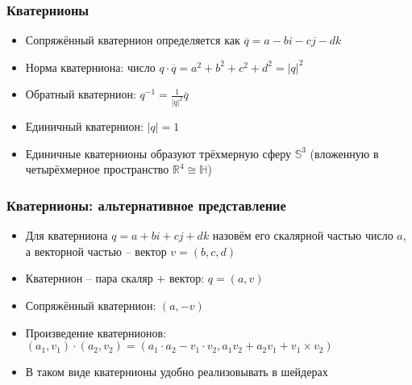 \documentclass[10pt]{beamer}
\begin{document}
\begin{frame}[fragile]
\frametitle{Кватернионы}
\begin{itemize}
\item Сопряжённый кватернион определяется как \begin{math}\overline q = a - bi - cj - dk\end{math}
\item Норма кватерниона: число \begin{math}q \cdot \overline q = a^2 + b^2 + c^2 + d^2 = |q|^2\end{math}
\item Обратный кватернион: \begin{math}q^{-1} = \frac{1}{|q|^2} \overline q\end{math}
\item Единичный кватернион: \begin{math}|q| = 1\end{math}
\item Единичные кватернионы образуют трёхмерную сферу \begin{math}\mathbb{S}^3\end{math} (вложенную в четырёхмерное пространство \begin{math}\mathbb{R}^4 \cong \mathbb{H}\end{math})
\end{itemize}
\end{frame}

\begin{frame}[fragile]
\frametitle{Кватернионы: альтернативное представление}
\begin{itemize}
\item Для кватерниона \begin{math}q = a + bi + cj + dk\end{math} назовём его скалярной частью число \begin{math}a\end{math}, а векторной частью -- вектор \begin{math}v = (b, c, d)\end{math}
\item Кватернион -- пара скаляр + вектор: \begin{math}q = (a, v)\end{math}
\pause
\item Сопряжённый кватернион: \begin{math}(a, -v)\end{math}
\pause
\item Произведение кватернионов: \begin{math}(a_1, v_1) \cdot (a_2, v_2) = (a_1 \cdot a_2 - v_1 \cdot v_2, a_1 v_2 + a_2 v_1 + v_1 \times v_2)\end{math}
\pause
\item В таком виде кватернионы удобно реализовывать в шейдерах
\end{itemize}
\end{frame}
\end{document}
